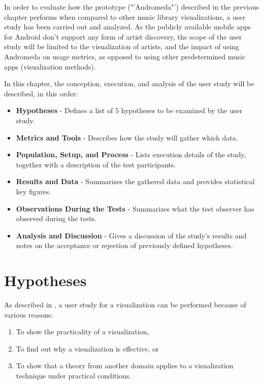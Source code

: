 In order to evaluate how the prototype ("'Andromeda"') described in the previous chapter performs when compared to other music library visualizations, a user study has been carried out and analyzed. As the publicly available mobile apps for Android don't support any form of artist discovery, the scope of the user study will be limited to the visualization of artists, and the impact of using Andromeda on usage metrics, as opposed to using other predetermined music apps (visualization methods).

In this chapter, the conception, execution, and analysis of the user study will be described, in this order:

\begin{itemize}
	\item \textbf {Hypotheses} - Defines a list of 5 hypotheses to be examined by the user study.
	\item \textbf {Metrics and Tools} - Describes how the study will gather which data.
	\item \textbf {Population, Setup, and Process} - Lists execution details of the study, together with a description of the test participants.
	\item \textbf {Results and Data} - Summarizes the gathered data and provides statistical key figures.
	\item \textbf {Observations During the Tests} - Summarizes what the test observer has observed during the tests.
	\item \textbf {Analysis and Discussion} - Gives a discussion of the study's results and notes on the acceptance or rejection of previously defined hypotheses.
\end{itemize}

\section{Hypotheses}

As described in \cite{Christopher03thoughtson}, a user study for a visualization can be performed because of various reasons: 

\begin{enumerate}
	\item To show the practicality of a visualization,
	\item To find out why a visualization is effective, or
	\item To show that a theory from another domain applies to a visualization technique under practical conditions.
\end{enumerate}
	
